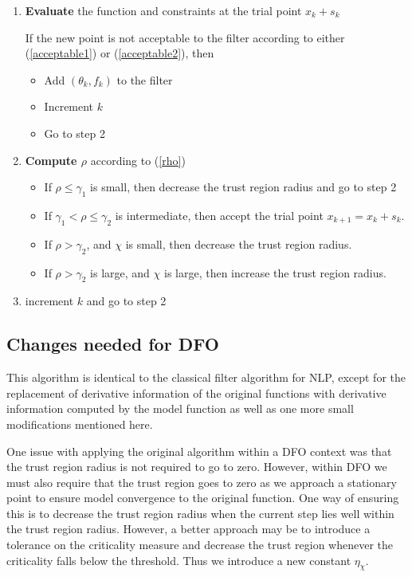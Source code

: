 \documentclass{article}
\let\oldref\ref
\renewcommand{\ref}[1]{(\oldref{#1})}
\begin{document}
\begin{enumerate}
\item \textbf{Evaluate} the function and constraints at the trial point $x_k + s_k$

If the new point is not acceptable to the filter according to either \ref{acceptable1} or \ref{acceptable2}, then
\begin{itemize}
\item Add $(\theta_k, f_k)$ to the filter
\item Increment $k$
\item Go to step 2
\end{itemize}

\item \textbf{Compute $\rho$} according to \ref{rho}
\begin{itemize}
\item If $\rho \le \gamma_1$ is small, then decrease the trust region radius and go to step 2
\item If $\gamma_1 < \rho \le \gamma_2$ is intermediate, then accept the trial point $x_{k+1} = x_{k} + s_k$.
\item If $\rho > \gamma_2$, and $\chi$ is small, then decrease the trust region radius.
\item If $\rho > \gamma_2$ is large, and $\chi$ is large, then increase the trust region radius.
\end{itemize}

\item increment $k$ and go to step 2
\end{enumerate}
\FloatBarrier

\underline{\hspace{20cm}}

\subsection{Changes needed for DFO}

This algorithm is identical to the classical filter algorithm for NLP, except for the replacement of derivative information of the original functions with derivative information computed by the model function as well as one more small modifications mentioned here.

One issue with applying the original algorithm within a DFO context was that the trust region radius is not required to go to zero.
However, within DFO we must also require that the trust region goes to zero as we approach a stationary point to ensure model convergence to the original function.
One way of ensuring this is to decrease the trust region radius when the current step lies well within the trust region radius.
However, a better approach may be to introduce a tolerance on the criticality measure and decrease the trust region whenever the criticality falls below the threshold. Thus we introduce a new constant $\eta_{\chi}$.
\end{document}
